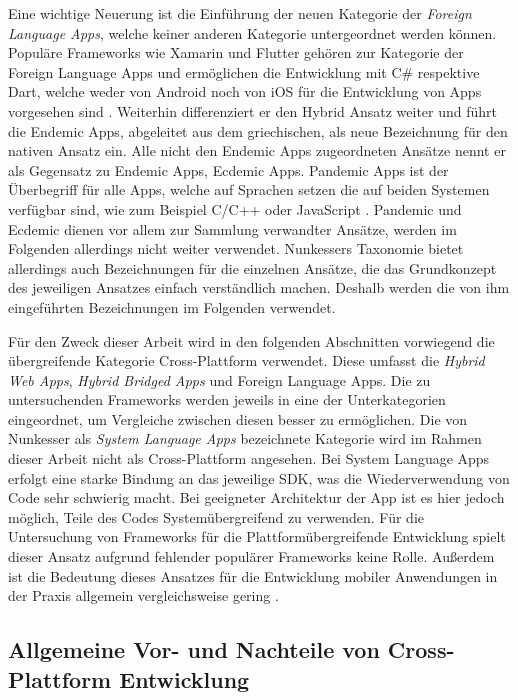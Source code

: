 Eine wichtige Neuerung ist die Einführung der neuen Kategorie der \textit{Foreign Language Apps}, welche keiner anderen Kategorie untergeordnet werden können.
Populäre Frameworks wie Xamarin und Flutter gehören zur Kategorie der Foreign Language Apps und ermöglichen die Entwicklung mit C\# respektive Dart, welche weder von Android noch von iOS für die Entwicklung von Apps vorgesehen sind \cite{Xamarin_Homepage,Flutter_Architektur}.
Weiterhin differenziert er den Hybrid Ansatz weiter und führt die Endemic Apps, abgeleitet aus dem griechischen, als neue Bezeichnung für den nativen Ansatz ein.
Alle nicht den Endemic Apps zugeordneten Ansätze nennt er als Gegensatz zu Endemic Apps, Ecdemic Apps.
Pandemic Apps ist der Überbegriff für alle Apps, welche auf Sprachen setzen die auf beiden Systemen verfügbar sind, wie zum Beispiel C/C++ oder JavaScript \cite{Nunkesser_Taxonomy_Apps}.
Pandemic und Ecdemic dienen vor allem zur Sammlung verwandter Ansätze, werden im Folgenden allerdings nicht weiter verwendet.
Nunkessers Taxonomie bietet allerdings auch Bezeichnungen für die einzelnen Ansätze, die das Grundkonzept des jeweiligen Ansatzes einfach verständlich machen.
Deshalb werden die von ihm eingeführten Bezeichnungen im Folgenden verwendet.

Für den Zweck dieser Arbeit wird in den folgenden Abschnitten vorwiegend die übergreifende Kategorie Cross-Plattform verwendet.
Diese umfasst die \textit{Hybrid Web Apps}, \textit{Hybrid Bridged Apps} und Foreign Language Apps.
Die zu untersuchenden Frameworks werden jeweils in eine der Unterkategorien eingeordnet, um Vergleiche zwischen diesen besser zu ermöglichen.
Die von Nunkesser als \textit{System Language Apps} bezeichnete Kategorie wird im Rahmen dieser Arbeit nicht als Cross-Plattform angesehen.
Bei System Language Apps erfolgt eine starke Bindung an das jeweilige \ac{SDK}, was die Wiederverwendung von Code sehr schwierig macht.
Bei geeigneter Architektur der App ist es hier jedoch möglich, Teile des Codes Systemübergreifend zu verwenden.
Für die Untersuchung von Frameworks für die Plattformübergreifende Entwicklung spielt dieser Ansatz aufgrund fehlender populärer Frameworks keine Rolle.
Außerdem ist die Bedeutung dieses Ansatzes für die Entwicklung mobiler Anwendungen in der Praxis allgemein vergleichsweise gering \cite{Nunkesser_Taxonomy_Apps}.


\subsection{Allgemeine Vor- und Nachteile von Cross-Plattform Entwicklung}
\label{sec:CrossPlattform_Vorteile}


